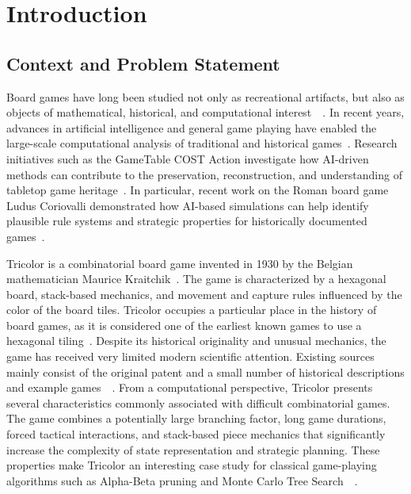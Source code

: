 \chapter{Introduction}
\label{introduction}

\section{Context and Problem Statement}

Board games have long been studied not only as recreational artifacts, but also as objects of mathematical, historical, and computational interest~\cite{shannon1950chess2}~\cite{browne2010evolutionary}. In recent years, advances in artificial intelligence and general game playing have enabled the large-scale computational analysis of traditional and historical games~\cite{piette2020ludii}. Research initiatives such as the GameTable COST Action investigate how AI-driven methods can contribute to the preservation, reconstruction, and understanding of tabletop game heritage~\cite{piette2024gametable_kickoff}. In particular, recent work on the Roman board game Ludus Coriovalli demonstrated how AI-based simulations can help identify plausible rule systems and strategic properties for historically documented games~\cite{crist2026ludus_coriovalli}.

Tricolor is a combinatorial board game invented in 1930 by the Belgian mathematician Maurice Kraitchik~\cite{rougetet2025kraitchik}. The game is characterized by a hexagonal board, stack-based mechanics, and movement and capture rules influenced by the color of the board tiles. Tricolor occupies a particular place in the history of board games, as it is considered one of the earliest known games to use a hexagonal tiling~\cite{kraitchik1930tricolor}. Despite its historical originality and unusual mechanics, the game has received very limited modern scientific attention. Existing sources mainly consist of the original patent and a small number of historical descriptions and example games~\cite{kraitchik1930tricolor}~\cite{kraitchik1930mathematique}.
From a computational perspective, Tricolor presents several characteristics commonly associated with difficult combinatorial games. The game combines a potentially large branching factor, long game durations, forced tactical interactions, and stack-based piece mechanics that significantly increase the complexity of state representation and strategic planning. These properties make Tricolor an interesting case study for classical game-playing algorithms such as Alpha-Beta pruning and Monte Carlo Tree Search~\cite{russell2010aima}~\cite{browne2012mcts}.

